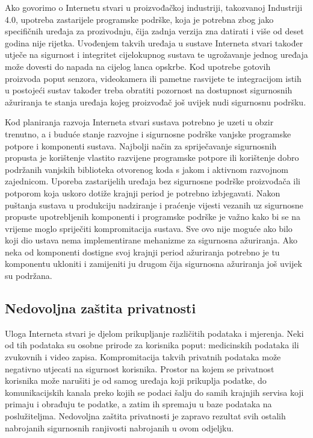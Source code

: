 \documentclass[times, utf8, diplomski]{fer}
\begin{document}
Ako govorimo o Internetu stvari u proizvođačkoj industriji, takozvanoj Industriji 4.0, upotreba zastarijele programske podrške, koja je potrebna zbog jako specifičnih uređaja za prozivodnju, čija zadnja verzija zna datirati i više od deset godina nije rijetka. Uvođenjem takvih uređaja u sustave Interneta stvari također utječe na sigurnost i integritet cijelokupnog sustava te ugrožavanje jednog uređaja može dovesti do napada na cijelog lanca opskrbe. Kod upotrebe gotovih proizvoda poput senzora, videokamera ili pametne rasvijete te integracijom istih u postojeći sustav također treba obratiti pozornost na dostupnost sigurnosnih ažuriranja te stanja uređaja kojeg proizvođač još uvijek nudi sigurnosnu podršku.

Kod planiranja razvoja Interneta stvari sustava potrebno je uzeti u obzir trenutno, a i buduće stanje razvojne i sigurnosne podrške vanjske programske potpore i komponenti sustava. Najbolji način za spriječavanje sigurnosnih propusta je korištenje vlastito razvijene programske potpore ili korištenje dobro podržanih vanjskih biblioteka otvorenog koda s jakom i aktivnom razvojnom zajednicom. Uporeba zastarijelih uređaja bez sigurnosne podrške proizvođača ili potporom koja uskoro dotiže krajnji period  je potrebno izbjegavati. Nakon puštanja sustava u produkciju nadziranje i praćenje vijesti vezanih uz sigurnosne propuste upotrebljenih komponenti i programske podrške je važno kako bi se na vrijeme moglo spriječiti kompromitacija sustava. Sve ovo nije moguće ako bilo koji dio ustava nema implementirane mehanizme za sigurnosna ažuriranja. Ako neka od komponenti dostigne svoj krajnji period ažuriranja potrebno je tu komponentu ukloniti i zamijeniti ju drugom čija sigurnosna ažuriranja još uvijek su podržana.  

\subsection{Nedovoljna zaštita privatnosti}
Uloga Interneta stvari je djelom prikupljanje različitih podataka i mjerenja. Neki od tih podataka su osobne prirode za korisnika poput: medicinskih podataka ili zvukovnih i video zapisa. Kompromitacija takvih privatnih podataka može negativno utjecati na sigurnost korisnika. Prostor na kojem se privatnost korisnika može narušiti je od samog uređaja koji prikuplja podatke, do komunikacijskih kanala preko kojih se podaci šalju do samih krajnjih servisa koji primaju i obrađuju te podatke, a zatim ih spremaju u baze podataka na poslužiteljma. Nedovoljna zaštita privatnosti je zapravo rezultat svih ostalih nabrojanih sigurnosnih ranjivosti nabrojanih u ovom odjeljku. 
\end{document}
